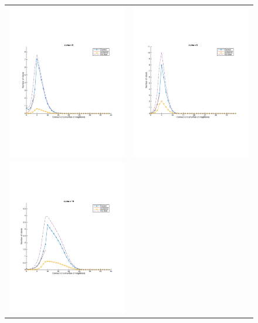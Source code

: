 \documentclass[a4paper, 10pt, conference]{ieeeconf}
\begin{document}
  \begin{figure}[p]
    \begin{center}
      \begin{tabular}{lr}
        \includegraphics[width=8cm]{figures/simulation-40-alpha-5.pdf}   &
        \includegraphics[width=8cm]{figures/macroscopic-40-alpha-5.pdf}  \\
        \includegraphics[width=8cm]{figures/simulation-40-alpha-10.pdf}  &

\end{tabular}
\end{center}
\end{figure}
\end{document}

